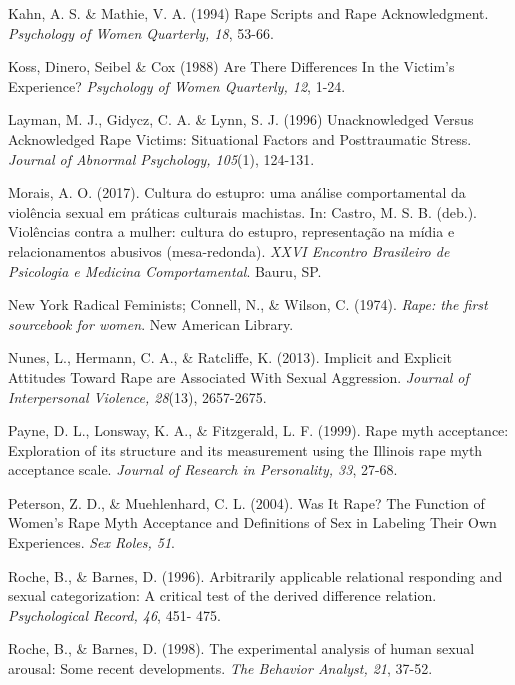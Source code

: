 \hangindent=25pt
\noindent Kahn, A. S. \& Mathie, V. A. (1994) Rape Scripts and Rape Acknowledgment. \textit{Psychology of Women Quarterly, 18}, 53-66.

\hangindent=25pt
\noindent Koss, Dinero, Seibel \& Cox (1988) Are There Differences In the Victim's Experience? \textit{Psychology of Women Quarterly, 12}, 1-24.

\hangindent=25pt
\noindent Layman, M. J., Gidycz, C. A. \& Lynn, S. J. (1996) Unacknowledged Versus Acknowledged Rape Victims: Situational Factors and Posttraumatic Stress. \textit{Journal of Abnormal Psychology, 105}(1), 124-131.

\hangindent=25pt
\noindent Morais, A. O. (2017). Cultura do estupro: uma análise comportamental da violência sexual em práticas culturais machistas. In: Castro, M. S. B. (deb.). Violências contra a mulher: cultura do estupro, representação na mídia e relacionamentos abusivos (mesa-redonda). \textit{XXVI Encontro Brasileiro de Psicologia e Medicina Comportamental}. Bauru, SP.

\hangindent=25pt
\noindent New York Radical Feminists; Connell, N., \& Wilson, C. (1974). \textit{Rape: the first sourcebook for women}. New American Library. 

\hangindent=25pt
\noindent Nunes, L., Hermann, C. A., \& Ratcliffe, K. (2013). Implicit and Explicit Attitudes Toward Rape are Associated With Sexual Aggression. \textit{Journal of Interpersonal Violence, 28}(13), 2657-2675.

\hangindent=25pt
\noindent Payne, D. L., Lonsway, K. A., \& Fitzgerald, L. F. (1999). Rape myth acceptance: Exploration of its structure and its measurement using the Illinois rape myth acceptance scale. \textit{Journal of Research in Personality, 33}, 27-68.

\hangindent=25pt
\noindent Peterson, Z. D., \& Muehlenhard, C. L. (2004). Was It Rape? The Function of Women’s Rape Myth Acceptance and Definitions of Sex in Labeling Their Own Experiences. \textit{Sex Roles, 51}.

\hangindent=25pt
\noindent Roche, B., \& Barnes, D. (1996). Arbitrarily applicable relational responding and sexual categorization: A critical test of the derived difference relation. \textit{Psychological Record, 46}, 451- 475.

\hangindent=25pt
\noindent Roche, B., \& Barnes, D. (1998). The experimental analysis of human sexual arousal: Some recent developments. \textit{The Behavior Analyst, 21}, 37-52.

